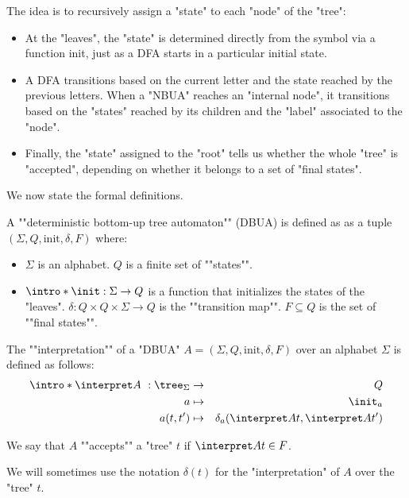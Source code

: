 \documentclass[a4paper,UKenglish,cleveref, autoref, thm-restate]{lipics-v2021}
\begin{document}
The idea is to recursively assign a "state" to each "node" of the "tree":
\begin{itemize}
	\item At the "leaves", the "state" is determined directly from the symbol via a function init, just as a DFA starts in a particular initial state.
	\item A DFA transitions based on the current letter and the state reached by the previous letters.
	      When a "NBUA" reaches an "internal node", it transitions based on the "states" reached by its children and the "label" associated to the "node".
	\item Finally, the "state" assigned to the "root" tells us whether the whole "tree" is "accepted",
	      depending on whether it belongs to a set of "final states".
\end{itemize}

We now state the formal definitions.

\begin{definition}
	\AP A ""deterministic bottom-up tree automaton"" (DBUA) is defined as as a tuple $(\Sigma, Q, \text{init}, \delta, F)$ where:
	\begin{itemize}
		\item $\Sigma$ is an alphabet.
		      \itemAP $Q$ is a finite set of ""states"".
		\item $\intro *\init : \Sigma \to Q$ is a function that initializes the states of the "leaves".
		      \itemAP $\delta : Q \times Q \times \Sigma \to Q$ is the ""transition map"".
		      \itemAP $F \subseteq Q$ is the set of ""final states"".
	\end{itemize}
\end{definition}

\begin{definition}
	\AP The ""interpretation"" of a "DBUA" $A = (\Sigma, Q, \text{init}, \delta, F)$  over an alphabet $\Sigma$ is defined as follows:
	\begin{eqnarray*}
		\intro* \interpret A ~: \tree_{\Sigma} &\to& Q \\
		a &\mapsto& \init_a \\
		a(t,t') &\mapsto& \delta_a (\interpret A t, \interpret A {t'})
	\end{eqnarray*}

	We say that $A$ ""accepts"" a "tree" $t$ if $\interpret A t \in F$.

	We will sometimes use the notation $\delta(t)$ for the "interpretation" of $A$ over the "tree" $t$.
\end{definition}
\end{document}

